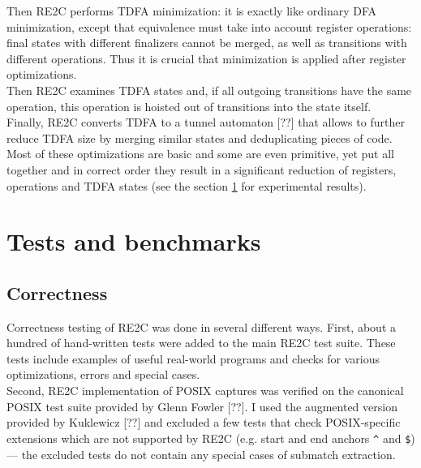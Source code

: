 \documentclass{article}
\theoremstyle{definition}
\begin{document}
\begin{multicols}{2}
Then RE2C performs TDFA minimization:
it is exactly like ordinary DFA minimization, except that
equivalence must take into account register operations:
final states with different finalizers cannot be merged, as well as transitions with different operations.
Thus it is crucial that minimization is applied after register optimizations.
\\

Then RE2C examines TDFA states and, if all outgoing transitions have the same operation,
this operation is hoisted out of transitions into the state itself.
\\

Finally, RE2C converts TDFA to a tunnel automaton [??]
that allows to further reduce TDFA size by merging similar states and deduplicating pieces of code.
\\

Most of these optimizations are basic and some are even primitive, yet put all together and in correct order
they result in a significant reduction of registers, operations and TDFA states
(see the section \ref{section_tests_and_benchmarks} for experimental results).

\section{Tests and benchmarks}\label{section_tests_and_benchmarks}

\subsection*{Correctness}

Correctness testing of RE2C was done in several different ways.
First, about a hundred of hand-written tests were added to the main RE2C test suite.
These tests include examples of useful real-world programs
and checks for various optimizations, errors and special cases.
\\

Second, RE2C implementation of POSIX captures was verified on the canonical POSIX test suite provided by Glenn Fowler [??].
I used the augmented version provided by Kuklewicz [??] and excluded a few tests that check POSIX-specific extensions
which are not supported by RE2C (e.g. start and end anchors \texttt{\^} and \texttt{\$}) ---
the excluded tests do not contain any special cases of submatch extraction.
\\


\end{multicols}
\end{document}
